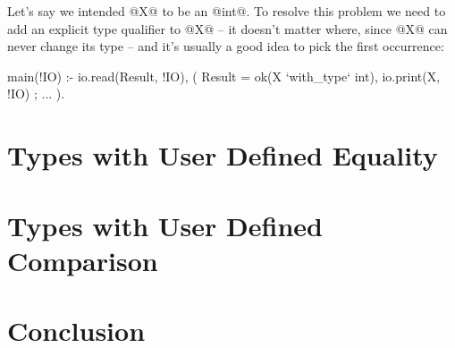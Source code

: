 Let's say we intended @X@ to be an @int@.
To resolve this problem we need to add an explicit type qualifier to @X@ --
it doesn't matter where, since @X@ can never change its type -- and it's
usually a good idea to pick the first occurrence:
\begin{myverbatim}
main(!IO) :-
    io.read(Result, !IO),
    (
        Result = ok(X `with_type` int),
        io.print(X, !IO)
    ;
        ...
    ).
\end{myverbatim}

\section{Types with User Defined Equality}


\section{Types with User Defined Comparison}


\section{Conclusion}


